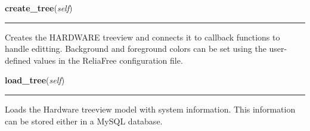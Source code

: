     \label{reliafree:hardware:Hardware:create_tree}

    \vspace{0.5ex}

\hspace{.8\funcindent}\begin{boxedminipage}{\funcwidth}

    \raggedright \textbf{create\_tree}(\textit{self})

    \vspace{-1.5ex}

    \rule{\textwidth}{0.5\fboxrule}
\setlength{\parskip}{2ex}
    Creates the HARDWARE treeview and connects it to callback functions to 
    handle editting.  Background and foreground colors can be set using the
    user-defined values in the ReliaFree configuration file.

\setlength{\parskip}{1ex}
    \end{boxedminipage}

    \label{reliafree:hardware:Hardware:load_tree}

    \vspace{0.5ex}

\hspace{.8\funcindent}\begin{boxedminipage}{\funcwidth}

    \raggedright \textbf{load\_tree}(\textit{self})

    \vspace{-1.5ex}

    \rule{\textwidth}{0.5\fboxrule}
\setlength{\parskip}{2ex}
    Loads the Hardware treeview model with system information. This 
    information can be stored either in a MySQL database.

\setlength{\parskip}{1ex}
    \end{boxedminipage}

    \label{reliafree:hardware:Hardware:save_hardware}

    \vspace{0.5ex}

